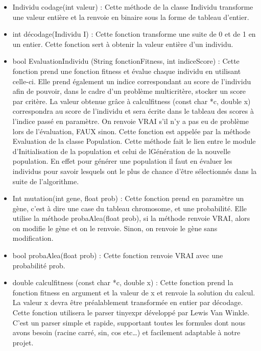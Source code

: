 \documentclass[a4paper,11pt]{article}
\begin{document}
				\begin{itemize}
							\item Individu codage(int valeur) : Cette méthode de la classe Individu transforme une valeur entière et la renvoie en binaire sous la forme de tableau d’entier.\vspace{0.2cm}
							\item int décodage(Individu I) : Cette fonction transforme une suite de 0 et de 1 en un entier. Cette fonction sert à obtenir la valeur entière d’un individu.\vspace{0.2cm}
							\item bool EvaluationIndividu (String fonctionFitness, int indiceScore) : Cette fonction prend une fonction fitness et évalue chaque individu en utilisant celle-ci. 
																									Elle prend également un indice correspondant  au score de l’individu afin de pouvoir, dans le cadre d’un problème multicritère, stocker un score par critère. 
																									La valeur obtenue grâce à calculfitness (const char *c, double x) correspondra au score de l’individu et sera écrite dans le tableau des scores à l’indice passé en paramètre.
																									On renvoie VRAI s’il n’y a pas eu de problème lors de l’évaluation, FAUX sinon. Cette fonction est appelée par la méthode Evaluation de la classe Population.
																									Cette méthode fait le lien entre le module d’Initialisation de la population et celui de lGénération de la nouvelle population.
																									En effet pour générer une population il faut en évaluer les individus pour savoir lesquels ont le plus de chance d'être sélectionnés dans la suite de l'algorithme.\vspace{0.2cm}
							\item Int mutation(int gene, float prob) : Cette fonction prend en paramètre un gène, c’est à dire une case du tableau chromosome, et une probabilité.
																		Elle utilise la méthode probaAlea(float prob), si la méthode renvoie VRAI, alors on modifie le gène et on le renvoie.
																		Sinon, on renvoie le gène sans modification.\vspace{0.2cm}
							\item bool probaAlea(float prob) : Cette fonction renvoie VRAI avec une probabilité prob.\vspace{0.2cm}
							\item double calculfitness (const char *c, double x) : Cette fonction prend la fonction fitness en argument et la valeur de x et renvoie la solution du calcul. La valeur x devra être préalablement transformée en entier par décodage.
								Cette fonction utilisera le parser tinyexpr développé par Lewis Van Winkle. 
								C’est un parser simple et rapide, supportant toutes les formules dont nous avons besoin (racine carré, sin, cos etc…) et facilement adaptable à notre projet. 
					\end{itemize}
		
\end{document}
